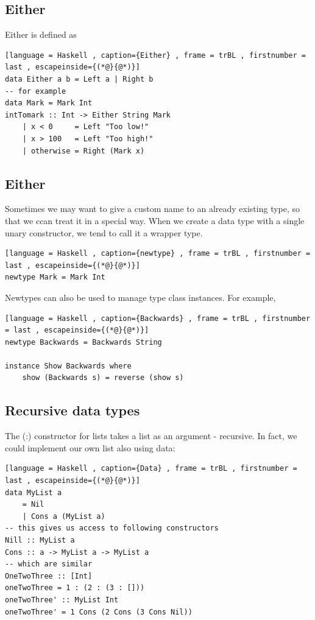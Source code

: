 \documentclass[a4paper]{article}
\theoremstyle{plain}
\theoremstyle{definition}
\theoremstyle{remark}
\begin{document}
\subsection{Either}
Either is defined as
\begin{lstlisting}[language = Haskell , caption={Either} , frame = trBL , firstnumber = last , escapeinside={(*@}{@*)}]
data Either a b = Left a | Right b
-- for example
data Mark = Mark Int
intTomark :: Int -> Either String Mark
	| x < 0		= Left "Too low!"
	| x > 100	= Left "Too high!"
	| otherwise	= Right (Mark x)
\end{lstlisting}
\subsection{Either}
Sometimes we may want to give a custom name to an already existing type, so that we ccan treat it in a special way. When we create a data type with a single unary constructor, we tend to call it a wrapper type.
\begin{lstlisting}[language = Haskell , caption={newtype} , frame = trBL , firstnumber = last , escapeinside={(*@}{@*)}]
newtype Mark = Mark Int
\end{lstlisting}
Newtypes can also be used to manage type class instances. 
For example,
\begin{lstlisting}[language = Haskell , caption={Backwards} , frame = trBL , firstnumber = last , escapeinside={(*@}{@*)}]
newtype Backwards = Backwards String

instance Show Backwards where
	show (Backwards s) = reverse (show s)
\end{lstlisting}
\subsection{Recursive data types}
The (:) constructor for lists takes a list as an argument - recursive. In fact, we could implement our own list also using data:
\begin{lstlisting}[language = Haskell , caption={Data} , frame = trBL , firstnumber = last , escapeinside={(*@}{@*)}]
data MyList a
	= Nil
	| Cons a (MyList a)
-- this gives us access to following constructors
Nill :: MyList a
Cons :: a -> MyList a -> MyList a
-- which are similar
OneTwoThree :: [Int]
oneTwoThree = 1 : (2 : (3 : []))
oneTwoThree' :: MyList Int
oneTwoThree' = 1 Cons (2 Cons (3 Cons Nil))
\end{lstlisting}
\end{document}
